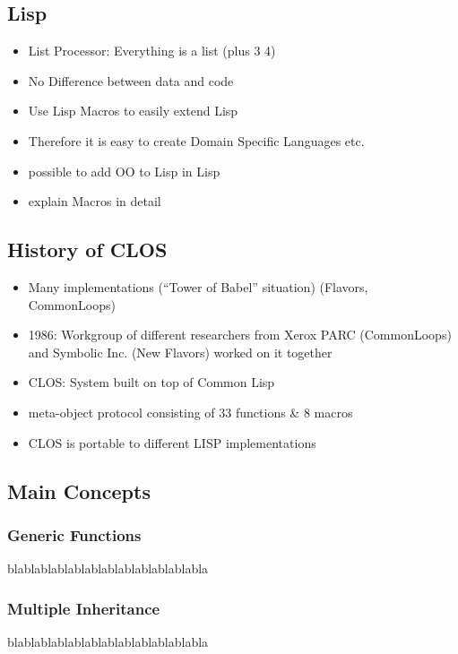 \documentclass[oribibl]{llncs}
\begin{document}
\subsection{Lisp}
\label{sec:lisp}

\begin{itemize}
\item List Processor: Everything is a list (plus 3 4)
\item No Difference between data and code
\item Use Lisp Macros to easily extend Lisp
\item Therefore it is easy to create Domain Specific
Languages etc.
\item possible to add OO to Lisp in Lisp
\item explain Macros in detail
\end{itemize}


\subsection{History of CLOS}
\label{sec:history}

\begin{itemize}
\item Many implementations (“Tower of Babel” situation) (Flavors, CommonLoops)
\item 1986: Workgroup of different researchers from Xerox PARC (CommonLoops) and Symbolic Inc. (New Flavors) worked on it together 
\item CLOS: System built on top of Common Lisp
\item meta-object protocol consisting of 33 functions \& 8 macros
\item CLOS is portable to different LISP implementations
\end{itemize}

\subsection{Main Concepts}
\label{sec:concepts}

\subsubsection{Generic Functions}
\label{sec:genfun}
blablablablablablablablablablablabla

\subsubsection{Multiple Inheritance}
\label{sec:mulinh}
blablablablablablablablablablablabla
\end{document}
